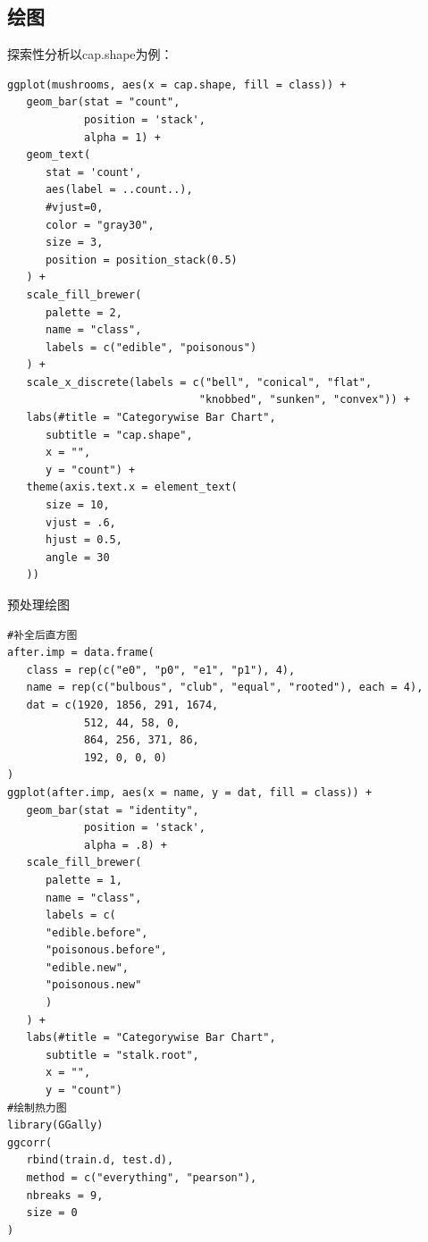 \documentclass[lang=cn,11pt,a4paper,cite=super]{elegantpaper}
\begin{document}
\subsection{绘图}\label{sec:plot}
探索性分析以cap.shape为例：
\begin{lstlisting}[style=R]
ggplot(mushrooms, aes(x = cap.shape, fill = class)) +
   geom_bar(stat = "count",
            position = 'stack',
            alpha = 1) +
   geom_text(
      stat = 'count',
      aes(label = ..count..),
      #vjust=0,
      color = "gray30",
      size = 3,
      position = position_stack(0.5)
   ) +
   scale_fill_brewer(
      palette = 2,
      name = "class",
      labels = c("edible", "poisonous")
   ) +
   scale_x_discrete(labels = c("bell", "conical", "flat",
                              "knobbed", "sunken", "convex")) +
   labs(#title = "Categorywise Bar Chart",
      subtitle = "cap.shape",
      x = "",
      y = "count") +
   theme(axis.text.x = element_text(
      size = 10,
      vjust = .6,
      hjust = 0.5,
      angle = 30
   ))
\end{lstlisting}
预处理绘图
\begin{lstlisting}[style=R]
#补全后直方图
after.imp = data.frame(
   class = rep(c("e0", "p0", "e1", "p1"), 4),
   name = rep(c("bulbous", "club", "equal", "rooted"), each = 4),
   dat = c(1920, 1856, 291, 1674,
            512, 44, 58, 0,
            864, 256, 371, 86,
            192, 0, 0, 0)
)
ggplot(after.imp, aes(x = name, y = dat, fill = class)) +
   geom_bar(stat = "identity",
            position = 'stack',
            alpha = .8) +
   scale_fill_brewer(
      palette = 1,
      name = "class",
      labels = c(
      "edible.before",
      "poisonous.before",
      "edible.new",
      "poisonous.new"
      )
   ) +
   labs(#title = "Categorywise Bar Chart",
      subtitle = "stalk.root",
      x = "",
      y = "count")
#绘制热力图
library(GGally)
ggcorr(
   rbind(train.d, test.d),
   method = c("everything", "pearson"),
   nbreaks = 9,
   size = 0
)
\end{lstlisting}
\end{document}
